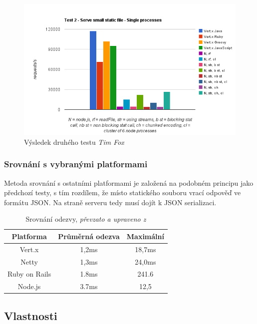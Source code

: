 \begin{figure}[t]
\begin{centering}
\includegraphics[scale=0.7]{obrazky/chart_3-5}
\par\end{centering}
\caption{Výsledek druhého testu \emph{Tim Fox} \cite{benchmarkTim}\label{fig:test2}}
\end{figure}

\subsubsection{Srovnání s vybranými platformami}

Metoda srovnání s ostatními platformami je založená na podobném principu jako předchozí testy, s tím rozdílem, že místo statického souboru vrací odpověď ve formátu JSON. Na straně serveru tedy musí dojít k JSON serializaci.

\begin{table}[h]
\centering
\caption{Srovnání odezvy, \emph{převzato a upraveno z} \cite{benchmark}}
\begin{tabular}{ |c|c|c| }
\hline
\textsf{\textbf{Platforma}} & \textsf{\textbf{Průměrná odezva}} & \textsf{\textbf{Maximální}}\tabularnewline
\hline
Vert.x & 1,2ms & 18,7ms\tabularnewline
\hline 
Netty & 1,3ms & 24,0ms\tabularnewline
\hline
Ruby on Rails & 1.8ms & 241.6\tabularnewline
\hline 
Node.js & 3.7ms & 12,5\tabularnewline
\hline
\end{tabular}
\label{table:odezvy}
\end{table}

\subsection{Vlastnosti}

